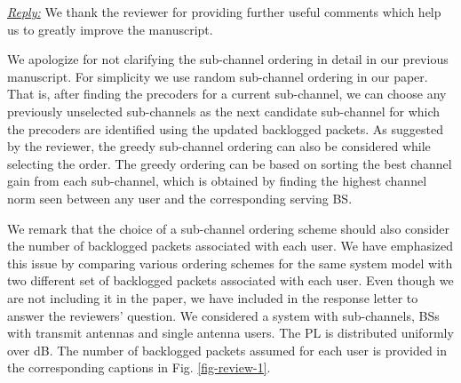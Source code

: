 
\vspace{1eM}
\underline{\textit{Reply:}} We thank the reviewer for providing further useful comments which help us to greatly improve the manuscript.

\begin{enumerate}

 

\resp We apologize for not clarifying the sub-channel ordering in detail in our previous manuscript. For simplicity we use random sub-channel ordering in our paper. That is, after finding the precoders for a current sub-channel, we can choose any previously unselected sub-channels as the next candidate sub-channel for which the precoders are identified using the updated backlogged packets. As suggested by the reviewer, the greedy sub-channel ordering can also be considered while selecting the order. The greedy ordering can be based on sorting the best channel gain from each sub-channel, which is obtained by finding the highest channel norm seen between any user and the corresponding serving \ac{BS}.  

We remark that the choice of a sub-channel ordering scheme should also consider the number of backlogged packets associated with each user. We have emphasized this issue by comparing various ordering schemes for the same system model with two different set of backlogged packets associated with each user. Even though we are not including it in the paper, we have included in the response letter to answer the reviewers' question. We considered a system with  sub-channels,  \acp{BS} with  transmit antennas and  single antenna users. The \ac{PL} is distributed uniformly over \eqn{[0,-3]} dB. The number of backlogged packets assumed for each user is provided in the corresponding captions in Fig. \ref{fig-review-1}.
\begin{figure*}[h!]
	\centering
	\hfill
	\caption{Convergence of the algorithms for  using  norm}
	\label{fig-review-1}
\end{figure*}


\end{enumerate}
